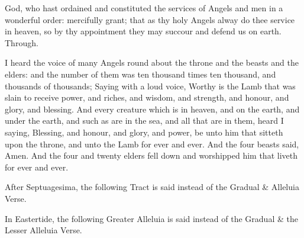  God, who hast ordained and constituted the services of Angels and men in a wonderful order: mercifully grant; that as thy holy Angels alway do thee service in heaven, so by thy appointment they may succour and defend us on earth. Through.

 I heard the voice of many Angels round about the throne and the beasts and the elders: and the number of them was ten thousand times ten thousand, and thousands of thousands; Saying with a loud voice, Worthy is the Lamb that was slain to receive power, and riches, and wisdom, and strength, and honour, and glory, and blessing. And every creature which is in heaven, and on the earth, and under the earth, and such as are in the sea, and all that are in them, heard I saying, Blessing, and honour, and glory, and power, be unto him that sitteth upon the throne, and unto the Lamb for ever and ever. And the four beasts said, Amen. And the four and twenty elders fell down and worshipped him that liveth for ever and ever.


\begin{rubric}
    After Septuagesima, the following Tract is said instead of the Gradual \& Alleluia Verse.
\end{rubric}


\begin{rubric}
    In Eastertide, the following Greater Alleluia is said instead of the Gradual \& the Lesser Alleluia Verse.
\end{rubric}

\vspace{-0.5ex}


